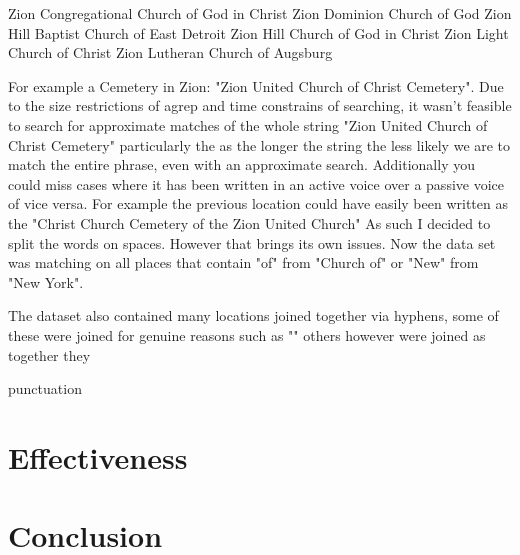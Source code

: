 \documentclass[a4paper]{article}
\begin{document}
Zion Congregational Church of God in Christ
Zion Dominion Church of God
Zion Hill Baptist Church of East Detroit
Zion Hill Church of God in Christ
Zion Light Church of Christ
Zion Lutheran Church of Augsburg


For example a Cemetery in Zion: "Zion United Church of Christ Cemetery". Due to the size restrictions of agrep and time constrains of searching, it wasn't feasible to search for approximate matches of the whole string "Zion United Church of Christ Cemetery"  particularly the as the longer the string the less likely we are to match the entire phrase, even with an approximate search. Additionally you could miss cases where it has been written in an active voice over a passive voice of vice versa. For example the previous location could have easily been written as the "Christ Church Cemetery of the Zion United Church" As such I decided to split the words on spaces. However that brings its own issues. Now the data set was matching on all places that contain "of" from "Church of" or "New" from "New York".


The dataset also contained many locations joined together via hyphens, some of these were joined for genuine reasons such as ""
others however were joined as together they


punctuation

\section{Effectiveness}


\section{Conclusion}
\end{document}
